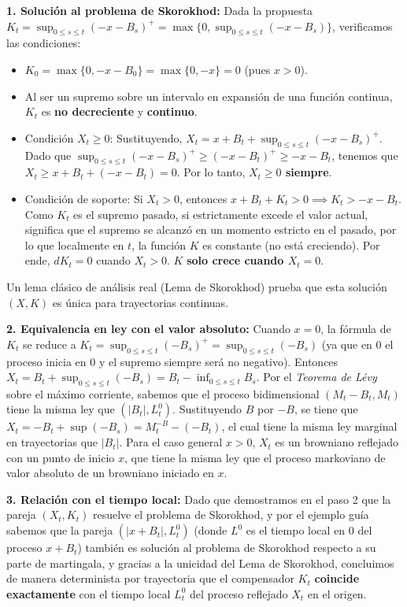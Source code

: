 \documentclass[11pt, letterpaper]{article}
\begin{document}
\begin{solucion}
    \textbf{1. Solución al problema de Skorokhod:}
    Dada la propuesta $K_t = \sup_{0 \le s \le t} (-x-B_s)^+ = \max\{0, \sup_{0 \le s \le t} (-x-B_s)\}$, verificamos las condiciones:
    \begin{itemize}
        \item $K_0 = \max\{0, -x-B_0\} = \max\{0, -x\} = 0$ (pues $x>0$).
        \item Al ser un supremo sobre un intervalo en expansión de una función continua, $K_t$ es \textbf{no decreciente} y \textbf{continuo}.
        \item Condición $X_t \ge 0$: Sustituyendo, $X_t = x + B_t + \sup_{0 \le s \le t} (-x-B_s)^+$. Dado que $\sup_{0 \le s \le t} (-x-B_s)^+ \ge (-x-B_t)^+ \ge -x-B_t$, tenemos que $X_t \ge x + B_t + (-x - B_t) = 0$. Por lo tanto, \textbf{$X_t \ge 0$ siempre}.
        \item Condición de soporte: Si $X_t > 0$, entonces $x + B_t + K_t > 0 \implies K_t > -x-B_t$. Como $K_t$ es el supremo pasado, si estrictamente excede el valor actual, significa que el supremo se alcanzó en un momento estricto en el pasado, por lo que localmente en $t$, la función $K$ es constante (no está creciendo). Por ende, $dK_t = 0$ cuando $X_t > 0$. $K$ \textbf{solo crece cuando $X_t = 0$}.
    \end{itemize}
    Un lema clásico de análisis real (Lema de Skorokhod) prueba que esta solución $(X, K)$ es única para trayectorias continuas.

    \textbf{2. Equivalencia en ley con el valor absoluto:}
    Cuando $x=0$, la fórmula de $K_t$ se reduce a $K_t = \sup_{0 \le s \le t} (-B_s)^+ = \sup_{0 \le s \le t} (-B_s)$ (ya que en 0 el proceso inicia en 0 y el supremo siempre será no negativo). 
    Entonces $X_t = B_t + \sup_{0 \le s \le t} (-B_s) = B_t - \inf_{0 \le s \le t} B_s$.
    Por el \textit{Teorema de Lévy} sobre el máximo corriente, sabemos que el proceso bidimensional $(M_t - B_t, M_t)$ tiene la misma ley que $(|B_t|, L_t^0)$. Sustituyendo $B$ por $-B$, se tiene que $X_t = -B_t + \sup(-B_s) = M_t^{-B} - (-B_t)$, el cual tiene la misma ley marginal en trayectorias que $|B_t|$.
    Para el caso general $x > 0$, $X_t$ es un browniano reflejado con un punto de inicio $x$, que tiene la misma ley que el proceso markoviano de valor absoluto de un browniano iniciado en $x$.

    \textbf{3. Relación con el tiempo local:}
    Dado que demostramos en el paso 2 que la pareja $(X_t, K_t)$ resuelve el problema de Skorokhod, y por el ejemplo guía sabemos que la pareja $(|x+B_t|, L_t^0)$ (donde $L^0$ es el tiempo local en 0 del proceso $x+B_t$) también es solución al problema de Skorokhod respecto a su parte de martingala, y gracias a la unicidad del Lema de Skorokhod, concluimos de manera determinista por trayectoria que el compensador $K_t$ \textbf{coincide exactamente} con el tiempo local $L_t^0$ del proceso reflejado $X_t$ en el origen.
\end{solucion}
\end{document}
